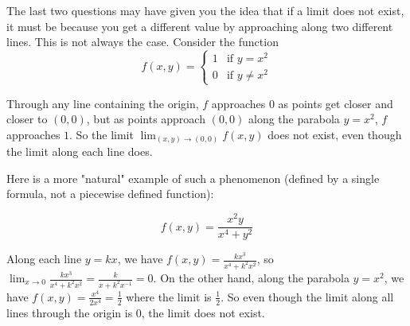 \documentclass{ximera}
\begin{document}
	The last two questions may have given you the idea that if a limit does not exist, it must be because you get a different value by approaching along two different lines.  
	This is not always the case.  Consider the function
	\[f(x,y) = \begin{cases}
			1 & \text{if $y = x^2$}\\
			0 & \text{if $y \neq x^2$}
		 \end{cases}\]
		 
	Through any line containing the origin, $f$ approaches $0$ as points get closer and closer to $(0,0)$, but as points approach $(0,0)$ along the parabola 
	$y=x^2$, $f$ approaches $1$.  So the limit $\displaystyle\lim_{(x,y) \to (0,0)} f(x,y)$ does not exist, even though the limit along each line does.
	
	Here is a more "natural" example of such a phenomenon (defined by a single formula, not a piecewise defined function):
	
	\[
		f(x,y) = \frac{x^2y}{x^4+y^2}
	\]
	
	Along each line $y = kx$, we have $f(x,y) = \frac{kx^3}{x^4+k^2x^2}$, so $\lim_{x \to 0} \frac{kx^3}{x^4+k^2x^2} = \frac{k}{x+k^2x^{-1}} = 0$.  
	On the other hand, along the parabola $y=x^2$, we have $f(x,y) = \frac{x^4}{2x^4} = \frac{1}{2}$ where the limit is $\frac{1}{2}$.  So even though the limit
	along all lines through the origin is $0$, the limit does not exist.
	
	
	
	
	
	
\end{document}
